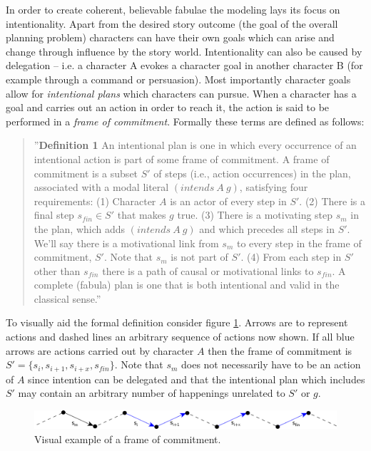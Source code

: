 In order to create coherent, believable fabulae the modeling lays its focus on intentionality. Apart from the desired story outcome (the goal of the overall planning problem) characters can have their own goals which can arise and change through influence by the story world. Intentionality can also be caused by delegation -- i.e. a character A evokes a character goal in another character B (for example through a command or persuasion). Most importantly character goals allow for \emph{intentional plans} which characters can pursue. When a character has a goal and carries out an action in order to reach it, the action is said to be performed in a \emph{frame of commitment}. Formally these terms are defined as follows:
\begin{quote}
''\textbf{Definition 1} An intentional plan is one in which every occurrence of an intentional action is part of some frame of commitment. A frame of commitment is a subset $S'$ of steps (i.e., action occurrences) in the plan, associated with a modal literal $(intends\ A\ g)$, satisfying four requirements: (1) Character $A$ is an actor of every step in $S'$. (2) There is a final step $s_{fin}\in S'$ that makes $g$ true. (3) There is a motivating step $s_m$ in the plan, which adds $(intends\ A\ g)$ and which precedes all steps in $S'$. We’ll say there is a motivational link from $s_m$ to every step in the frame of commitment, $S'$. Note that $s_m$ is not part of $S'$. (4) From each step in $S'$ other than $s_{fin}$ there is a path of causal or motivational links to $s_{fin}$. A complete (fabula) plan is one that is both intentional and valid in the classical sense.'' \cite{Haslum14}
\end{quote}
To visually aid the formal definition consider figure \ref{fig:intplan}. Arrows are to represent actions and dashed lines an arbitrary sequence of actions now shown. If all blue arrows are actions carried out by character $A$ then the frame of commitment is $S'=\{s_i,s_{i+1},s_{i+x},s_{fin}\}$. Note that $s_m$ does not necessarily have to be an action of $A$ since intention can be delegated and that the intentional plan which includes $S'$ may contain an arbitrary number of happenings unrelated to $S'$ or $g$.
\begin{figure}[htbp]
 \centering
 \includegraphics[scale=0.8]{intentional_plan}
 \caption{Visual example of a frame of commitment.}
 \label{fig:intplan}
\end{figure}

